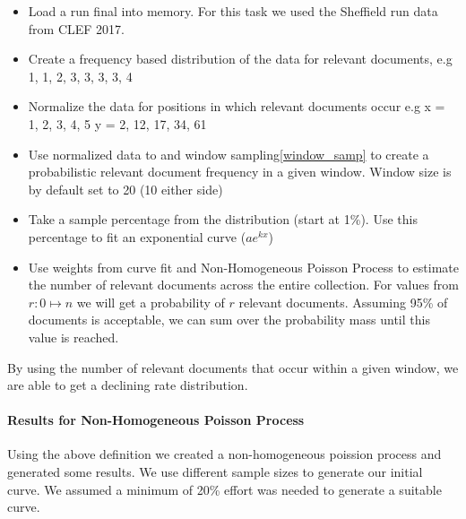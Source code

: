 \begin{itemize}
\item Load a run final into memory. For this task we used the Sheffield run data from CLEF 2017.

\item Create a frequency based distribution of the data for relevant documents, e.g 1, 1, 2, 3, 3, 3, 3, 4

\item Normalize the data for positions in which relevant documents occur e.g x = 1, 2, 3, 4, 5 y = 2, 12, 17, 34, 61

\item Use normalized data to and window sampling\ref{window_samp} to create a probabilistic relevant document frequency in a given window. Window size is by default set to 20 (10 either side)

\item Take a sample percentage from the distribution (start at 1\%). Use this percentage to fit an exponential curve ($ae^{kx}$)

\item Use weights from curve fit and Non-Homogeneous Poisson Process to estimate the number of relevant documents across the entire collection. For values from $r: 0 \mapsto n$ we will get a probability of $r$ relevant documents. Assuming 95\% of documents is acceptable, we can sum over the probability mass until this value is reached.





\end{itemize}


By using the number of relevant documents that occur within a given window, we are able to get a declining rate distribution. 

\paragraph{Results for Non-Homogeneous Poisson Process} \label{nn_pp_def}

Using the above definition we created a non-homogeneous poission process and generated some results. We use different sample sizes to generate our initial curve. We assumed a minimum of 20\% effort was needed to generate a suitable curve.

